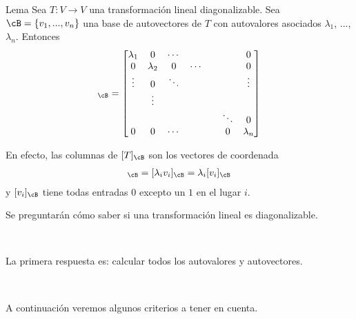 \documentclass[handout]{beamer} %
\begin{document}
\begin{frame}
	
	\begin{block}{Lema}
		Sea $T:V\longrightarrow V$ una transformación lineal diagonalizable. Sea $\cB=\{v_1, ..., v_n\}$ una base de autovectores de $T$ con autovalores asociados $\lambda_1$, ..., $\lambda_n$. Entonces 
		\begin{align*}
			[T]_\cB=
			\begin{bmatrix}
				\lambda_1 & 0 & \cdots & & &  & 0\\ 
				0 & \lambda_2 & 0& \cdots & &  & 0\\
				\vdots & 0 & \ddots & & &  & \vdots\\
				& \vdots &  & & & &  \\
				& &  & & &  \ddots&0\\
				0 & 0 & \cdots & & & 0 & \lambda_{n}
			\end{bmatrix}
		\end{align*}
	\end{block}
	
	En efecto, las columnas de $[T]_\cB$ son los vectores de coordenada
	\begin{align*}
		[T(v_i)]_\cB=[\lambda_i v_i]_\cB=\lambda_i[v_i]_\cB
	\end{align*}
	y $[v_i]_\cB$ tiene todas entradas $0$ excepto un $1$ en el lugar $i$.
	
\end{frame}

\begin{frame}
	Se preguntarán cómo saber si una transformación lineal es diagonalizable.\pause
	
	\
	
	La primera respuesta es: calcular todos los autovalores y autovectores.\pause
	
	\
	
	A continuación veremos algunos criterios a tener en cuenta.\pause
\end{frame}
\end{document}
